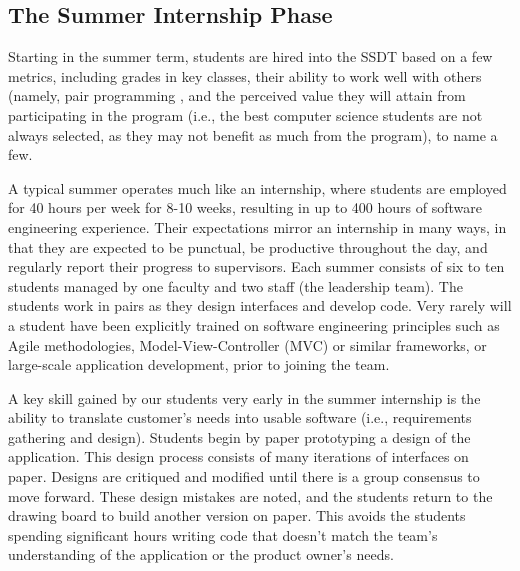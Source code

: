 \subsection{The Summer Internship Phase}
Starting in the summer term, students are hired into the SSDT based on a few metrics, including grades in key classes, their ability to work well with others (namely, pair programming \cite{2002PairProgramming}, and the perceived value they will attain from participating in the program (i.e., the best computer science students are not always selected, as they may not benefit as much from the program), to name a few.

A typical summer operates much like an internship, where students are employed for 40 hours per week for 8-10 weeks, resulting in up to 400 hours of software engineering experience. Their expectations mirror an internship in many ways, in that they are expected to be punctual, be productive throughout the day, and regularly report their progress to supervisors. Each summer consists of six to ten students managed by one faculty and two staff (the leadership team). The students work in pairs as they design interfaces and develop code. Very rarely will a student have been explicitly trained on software engineering principles such as Agile methodologies, Model-View-Controller (MVC) or similar frameworks, or large-scale application development, prior to joining the team.


A key skill gained by our students very early in the summer internship is the ability to translate customer's needs into usable software (i.e., requirements gathering and design). Students begin by paper prototyping \cite{2003paperPrototype} a design of the application. This design process consists of many iterations of interfaces on paper. Designs are critiqued and modified until there is a group consensus to move forward. These design mistakes are noted, and the students return to the drawing board to build another version on paper. This avoids the students spending significant hours writing code that doesn’t match the team’s understanding of the application or the product owner’s needs.


